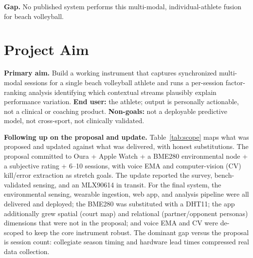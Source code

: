 \documentclass[sigconf,nonacm]{acmart}
\begin{document}
\textbf{Gap.} No published system performs this multi-modal, individual-athlete fusion for beach volleyball.

\section{Project Aim}
\textbf{Primary aim.} Build a working instrument that captures synchronized multi-modal sessions for a single beach volleyball athlete and runs a per-session factor-ranking analysis identifying which contextual streams plausibly explain performance variation. \textbf{End user:} the athlete; output is personally actionable, not a clinical or coaching product. \textbf{Non-goals:} not a deployable predictive model, not cross-sport, not clinically validated.

\textbf{Following up on the proposal and update.} Table~\ref{tab:scope} maps what was proposed and updated against what was delivered, with honest substitutions. The proposal committed to Oura + Apple Watch + a BME280 environmental node + a subjective rating + 6--10 sessions, with voice EMA and computer-vision (CV) kill/error extraction as stretch goals. The update reported the survey, bench-validated sensing, and an MLX90614 in transit. For the final system, the environmental sensing, wearable ingestion, web app, and analysis pipeline were all delivered and deployed; the BME280 was substituted with a DHT11; the app additionally grew spatial (court map) and relational (partner/opponent personas) dimensions that were not in the proposal; and voice EMA and CV were de-scoped to keep the core instrument robust. The dominant gap versus the proposal is session count: collegiate season timing and hardware lead times compressed real data collection.
\end{document}
